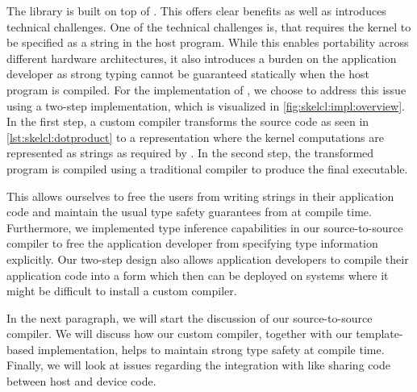 The \SkelCL library is built on top of \OpenCL.
This offers clear benefits as well as introduces technical challenges.
One of the technical challenges is, that \OpenCL requires the kernel to be specified as a string in the host program.
While this enables portability across different hardware architectures, it also introduces a burden on the application developer as strong typing cannot be guaranteed statically when the host program is compiled.
For the implementation of \SkelCL, we choose to address this issue using a two-step implementation, which is visualized in \autoref{fig:skelcl:impl:overview}.
In the first step, a custom compiler transforms the source code as seen in \autoref{lst:skelcl:dotproduct} to a representation where the kernel computations are represented as strings as required by \OpenCL.
In the second step, the transformed program is compiled using a traditional \Cpp compiler to produce the final executable.

This allows ourselves to free the users from writing strings in their application code and maintain the usual type safety guarantees from \Cpp at compile time.
Furthermore, we implemented type inference capabilities in our source-to-source compiler to free the application developer from specifying type information explicitly.
Our two-step design also allows application developers to compile their application code into a form which then can be deployed on systems where it might be difficult to install a custom compiler.

In the next paragraph, we will start the discussion of our source-to-source compiler.
We will discuss how our custom compiler, together with our template-based implementation, helps to maintain strong type safety at compile time.
Finally, we will look at issues regarding the integration with \Cpp like sharing code between host and device code.

